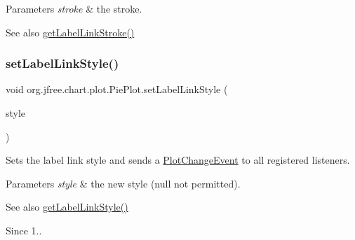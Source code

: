 \begin{DoxyParams}{Parameters}
{\em stroke} & the stroke.\\
\hline
\end{DoxyParams}
\begin{DoxySeeAlso}{See also}
\mbox{\hyperlink{classorg_1_1jfree_1_1chart_1_1plot_1_1_pie_plot_a9b1859596be7e3bf95be63ee3c08134c}{get\+Label\+Link\+Stroke()}} 
\end{DoxySeeAlso}
\mbox{\label{classorg_1_1jfree_1_1chart_1_1plot_1_1_pie_plot_af484541c4d3e06c2956dd06f7e39caa2}} 
\subsubsection{\texorpdfstring{set\+Label\+Link\+Style()}{setLabelLinkStyle()}}
{\footnotesize\ttfamily void org.\+jfree.\+chart.\+plot.\+Pie\+Plot.\+set\+Label\+Link\+Style (\begin{DoxyParamCaption}\item[{\mbox{\hyperlink{classorg_1_1jfree_1_1chart_1_1plot_1_1_pie_label_link_style}{Pie\+Label\+Link\+Style}}}]{style }\end{DoxyParamCaption})}

Sets the label link style and sends a \mbox{\hyperlink{}{Plot\+Change\+Event}} to all registered listeners.


\begin{DoxyParams}{Parameters}
{\em style} & the new style ({\ttfamily null} not permitted).\\
\hline
\end{DoxyParams}
\begin{DoxySeeAlso}{See also}
\mbox{\hyperlink{classorg_1_1jfree_1_1chart_1_1plot_1_1_pie_plot_a242faf0d00119da23a81e76be5dfda47}{get\+Label\+Link\+Style()}}
\end{DoxySeeAlso}
\begin{DoxySince}{Since}
1.. 
\end{DoxySince}
\mbox{\label{classorg_1_1jfree_1_1chart_1_1plot_1_1_pie_plot_aaf3586d5289e6bfd971a484dde785303}} 
